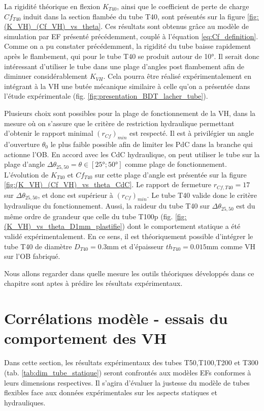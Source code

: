La rigidité théorique en flexion $K_{T40}$, ainsi que le coefficient de perte de charge $Cf_{T40}$ induit dans la section flambée du tube T40, sont présentés sur la figure \ref{fig:(K_VH)_(Cf_VH)_vs_theta}. Ces résultats sont obtenus grâce au modèle de simulation par EF présenté précédemment, couplé à l'équation \ref{eq:Cf_definition}. Comme on a pu constater précédemment, la rigidité du tube baisse rapidement après le flambement, qui pour le tube T40 se produit autour de \ang{10}. Il serait donc intéressant d'utiliser le tube dans une plage d'angles post flambement afin de diminuer considérablement $K_{VH}$. Cela pourra être réalisé expérimentalement en intégrant à la VH une butée mécanique similaire à celle qu'on a présentée dans l'étude expérimentale (fig. \ref{fig:presentation_BDT_lacher_tube}).

Plusieurs choix sont possibles pour la plage de fonctionnement de la VH, dans la mesure où on s'assure que le critère de restriction hydraulique permettant d'obtenir le rapport minimal $(r_{Cf})_{min}$ est respecté. Il est à privilégier un angle d'ouverture $\theta_0$ le plus faible possible afin de limiter les PdC dans la branche qui actionne l'OB. En accord avec les CdC hydraulique, on peut utiliser le tube sur la plage d'angle $\Delta \theta _{25,50} = \theta \in [\ang{25};\ang{50}]$ comme plage de fonctionnement. L'évolution de $K_{T40}$ et $Cf_{T40}$ sur cette plage d'angle est présentée sur la figure \ref{fig:(K_VH)_(Cf_VH)_vs_theta_CdC}.  Le rapport de fermeture $r_{Cf,T40}=17$ sur $\Delta \theta_{25,50}$, et donc est supérieur à $(r_{Cf})_{min}$. Le tube T40 valide donc le critère hydraulique du fonctionnement. Aussi, la raideur du tube T40 sur $\Delta \theta _{25,50}$ est du même ordre de grandeur que celle du tube T100p (fig. \ref{fig:(K_VH)_vs_theta_D1mm_plastifie}) dont le comportement statique a été validé expérimentalement. En ce sens, il est théoriquement possible d'intégrer le tube T40 de diamètre $D_{T40}=0.3$mm et d'épaisseur $th_{T40}=0.015$mm comme VH sur l'OB fabriqué.

Nous allons regarder dans quelle mesure les outils théoriques développés dans ce chapitre sont aptes à prédire les résultats expérimentaux.
\section{Corrélations modèle - essais du comportement des VH}
\label{sec:5.3}
Dans cette section, les résultats expérimentaux des tubes T50,T100,T200 et T300 (tab. \ref{tab:dim_tube_statique}) seront confrontés aux modèles EFs conformes à leurs dimensions respectives. Il s'agira d'évaluer la justesse du modèle de tubes flexibles face aux données expérimentales sur les aspects statiques et hydrauliques.
